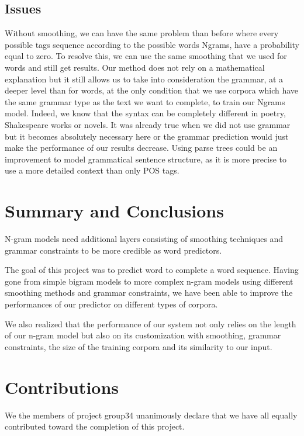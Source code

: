 \documentclass[a4paper,12pt]{article}
\begin{document}
\subsection{Issues}

Without smoothing, we can have the same problem than before where every possible tags sequence according to the possible words Ngrams, have a probability equal to zero. To resolve this, we can use the same smoothing that we used for words and still get results. Our method does not rely on a mathematical explanation but it still allows us to take into consideration the grammar, at a deeper level than for words, at the only condition that we use corpora which have the same grammar type as the text we want to complete, to train our Ngrams model. Indeed, we know that the syntax can be completely different in poetry, Shakespeare works or novels. It was already true when we did not use grammar but it becomes absolutely necessary here or the grammar prediction would just make the performance of our results decrease.
Using parse trees could be an improvement to model grammatical sentence structure, as it is more precise to use a more detailed context than only POS tags.

\section{Summary and Conclusions}
\label{sec:summary}

N-gram models need additional layers consisting of smoothing techniques and grammar constraints to be more credible as word predictors.

The goal of this project was to predict word to complete a word sequence. Having gone from simple bigram models to more complex n-gram models using different smoothing methods and grammar constraints, we have been able to improve the performances of our predictor on different types of corpora.

We also realized that the performance of our system not only relies on the length of our n-gram model but also on its customization with smoothing, grammar constraints, the size of the training corpora and its similarity to our input.


\section{Contributions}
\label{sec:contributions}
We the members of project group34 unanimously declare that 
we have all equally contributed toward the completion of this
project. 




\end{document}
